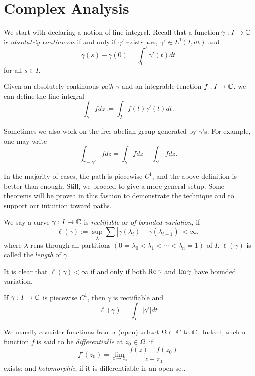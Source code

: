 \section{Complex Analysis}

We start with declaring a notion of line integral. Recall that a function $\gamma:I\to\mathbb{C}$ is \emph{absolutely continuous} if and only if $\gamma'$ exists a.e., $\gamma'\in L^1(I,dt)$ and
$$\gamma(s)-\gamma(0)=\int_0^s\gamma'(t)dt$$
for all $s\in I$.

\begin{definition}
    Given an absolutely continuous \emph{path} $\gamma$ and an integrable function $f:I\to\mathbb{C}$, we can define the line integral
    $$\int_\gamma fdz:=\int_If(t)\gamma'(t)dt.$$
    
    Sometimes we also work on the free abelian group generated by $\gamma$'s. For example, one may write
    $$\int_{\gamma-\gamma'}fdz=\int_\gamma fdz-\int_{\gamma'}fdz.$$
\end{definition}

In the majority of cases, the path is piecewise $C^1$, and the above definition is better than enough. Still, we proceed to give a more general setup. Some theorems will be proven in this fashion to demonstrate the technique and to support our intuition toward paths.

\begin{definition}
    We say a curve $\gamma:I\to\mathbb{C}$ is \emph{rectifiable} or \emph{of bounded variation}, if
    $$\ell(\gamma):=\sup_\lambda\sum|\gamma(\lambda_i)-\gamma(\lambda_{i+1})|<\infty,$$
    where $\lambda$ runs through all partitions $(0=\lambda_0<\lambda_1<
    \cdots<\lambda_n=1)$ of $I$. $\ell(\gamma)$ is called the \emph{length} of $\gamma$.

    It is clear that $\ell(\gamma)<\infty$ if and only if both $\operatorname{Re}\gamma$ and $\operatorname{Im}\gamma$ have bounded variation.
\end{definition}

\begin{proposition}
    If $\gamma:I\to\mathbb{C}$ is piecewise $C^1$, then $\gamma$ is rectifiable and
    $$\ell(\gamma)=\int_I|\gamma'|dt$$
\end{proposition}

%

\begin{definition}
    We usually consider functions from a (open) subset $\Omega\subset\mathbb{C}$ to $\mathbb{C}$. Indeed, such a function $f$ is said to be \emph{differentiable} at $z_0\in\Omega$, if
    $$f'(z_0)=\lim_{z\to z_0}\frac{f(z)-f(z_0)}{z-z_0}$$
    exists; and \emph{holomorphic}, if it is differentiable in an open set.
\end{definition}

